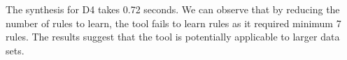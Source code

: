 The synthesis for D4 takes 0.72 seconds. We can observe that by reducing the number of rules to learn, the tool fails to learn rules as it required minimum 7 rules.
The results suggest that the tool is potentially applicable to larger data sets.









